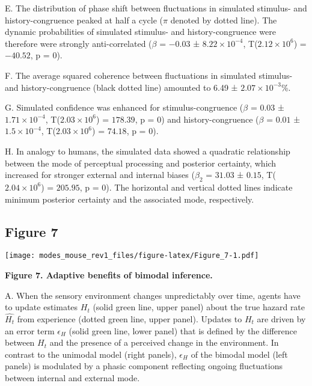 \documentclass[
]{article}
\begin{document}
E. The distribution of phase shift between fluctuations in simulated
stimulus- and history-congruence peaked at half a cycle (\(\pi\) denoted
by dotted line). The dynamic probabilities of simulated stimulus- and
history-congruence were therefore were strongly anti-correlated
(\(\beta\) = \(-0.03\) ± \(\ensuremath{8.22\times 10^{-4}}\),
T(\(\ensuremath{2.12\times 10^{6}}\)) = \(-40.52\), p = \(0\)).

F. The average squared coherence between fluctuations in simulated
stimulus- and history-congruence (black dotted line) amounted to 6.49 ±
\ensuremath{2.07\times 10^{-3}}\%.

G. Simulated confidence was enhanced for stimulus-congruence (\(\beta\)
= \(0.03\) ± \(\ensuremath{1.71\times 10^{-4}}\),
T(\(\ensuremath{2.03\times 10^{6}}\)) = \(178.39\), p = \(0\)) and
history-congruence (\(\beta\) = \(0.01\) ±
\(\ensuremath{1.5\times 10^{-4}}\),
T(\(\ensuremath{2.03\times 10^{6}}\)) = \(74.18\), p = \(0\)).

H. In analogy to humans, the simulated data showed a quadratic
relationship between the mode of perceptual processing and posterior
certainty, which increased for stronger external and internal biases
(\(\beta_2\) = \(31.03\) ± \(0.15\),
T(\(\ensuremath{2.04\times 10^{6}}\)) = \(205.95\), p = \(0\)). The
horizontal and vertical dotted lines indicate minimum posterior
certainty and the associated mode, respectively.

\newpage

\hypertarget{figure-7}{%
\subsection{Figure 7}\label{figure-7}}

\texttt{[image: modes\_mouse\_rev1\_files/figure-latex/Figure\_7-1.pdf]}

\textbf{Figure 7. Adaptive benefits of bimodal inference.}

A. When the sensory environment changes unpredictably over time, agents
have to update estimates \(H_t\) (solid green line, upper panel) about
the true hazard rate \(\hat{H_t}\) from experience (dotted green line,
upper panel). Updates to \(H_t\) are driven by an error term
\(\epsilon_H\) (solid green line, lower panel) that is defined by the
difference between \(H_t\) and the presence of a perceived change in the
environment. In contrast to the unimodal model (right panels),
\(\epsilon_H\) of the bimodal model (left panels) is modulated by a
phasic component reflecting ongoing fluctuations between internal and
external mode.
\end{document}
